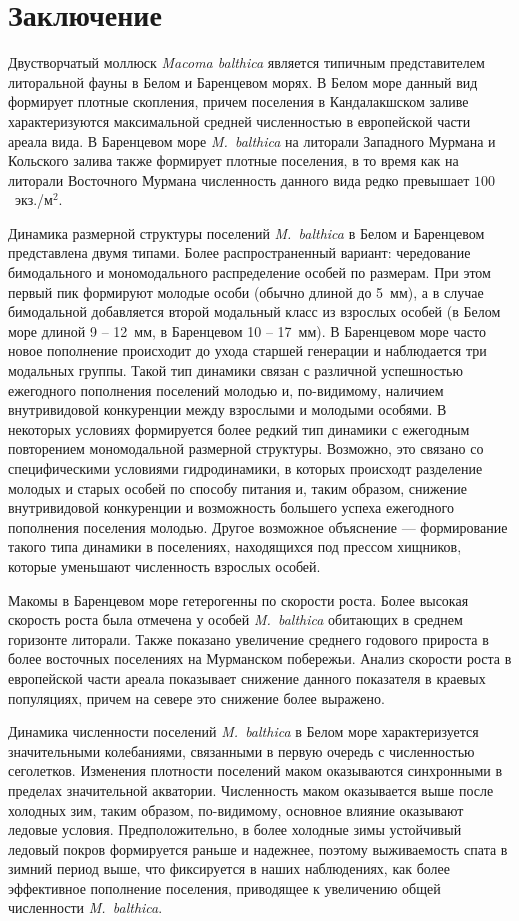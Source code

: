 	\section{Заключение}		

Двустворчатый моллюск \textit{Macoma balthica} является типичным представителем литоральной фауны в Белом и Баренцевом морях. 
В Белом море данный вид формирует плотные скопления, причем поселения в Кандалакшском заливе характеризуются максимальной средней численностью в европейской части ареала вида.
В Баренцевом море \textit{M.~balthica} на литорали Западного Мурмана и Кольского залива также формирует плотные поселения, в то время как на литорали Восточного Мурмана численность данного вида редко превышает $100$~экз./м$^2$.

Динамика размерной структуры поселений {\it M.~balthica} в Белом и Баренцевом представлена двумя типами.
Более распространенный вариант: чередование бимодального и мономодального распределение особей по размерам. 
При этом первый пик формируют молодые особи (обычно длиной до 5~мм), а в случае бимодальной добавляется второй модальный класс из взрослых особей (в Белом море длиной 9 -- 12~мм, в Баренцевом 10 -- 17~мм). 
В Баренцевом море часто новое пополнение происходит до ухода старшей генерации и наблюдается три модальных группы. 
Такой тип динамики связан с различной успешностью ежегодного пополнения поселений молодью и, по-видимому, наличием внутривидовой конкуренции между взрослыми и молодыми особями.
В некоторых условиях формируется более редкий тип динамики с ежегодным повторением мономодальной размерной структуры. 
Возможно, это связано со специфическими условиями гидродинамики, в которых происходт разделение молодых и старых особей по способу питания и, таким образом, снижение внутривидовой конкуренции и возможность большего успеха ежегодного пополнения поселения молодью. 
Другое возможное объяснение --- формирование такого типа динамики в поселениях, находящихся под прессом хищников, которые уменьшают численность взрослых особей.

Макомы в Баренцевом море гетерогенны по скорости роста. 
Более высокая скорость роста была отмечена у особей {\it M.~balthica} обитающих в среднем горизонте литорали.
Также показано увеличение среднего годового прироста в более восточных поселениях на Мурманском побережьи.
Анализ скорости роста в европейской части ареала показывает снижение данного показателя в краевых популяциях, причем на севере это снижение более выражено.

Динамика численности поселений {\it M.~balthica} в Белом море характеризуется значительными колебаниями, связанными в первую очередь с численностью сеголетков. Изменения плотности поселений маком оказываются синхронными в пределах значительной акватории.
Численность маком оказывается выше после холодных зим, таким образом, по-видимому, основное влияние оказывают ледовые условия.
Предположительно, в более холодные зимы устойчивый ледовый покров формируется раньше и надежнее, поэтому выживаемость спата в зимний период выше, что фиксируется в наших наблюдениях, как более эффективное пополнение поселения, приводящее к увеличению общей численности {\it M.~balthica}.


